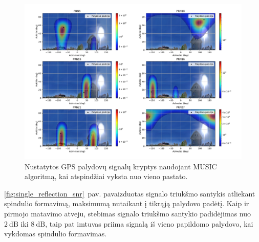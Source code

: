 \documentclass[main.tex]{subfiles}
\begin{document}
\begin{figure}[ht]
    \begin{centering}
    \includegraphics[scale=0.45]{drawings/one_reflection_2}
    \par\end{centering}
    \protect\caption{\label{fig:single_reflection}Nustatytos GPS palydovų signalų kryptys naudojant MUSIC algoritmą, kai atspindžiai vyksta nuo vieno pastato.}
\end{figure}

\ref{fig:single_reflection_snr}~pav. pavaizduotas signalo triukšmo santykis atliekant spindulio formavimą,
maksimumą nutaikant į tikrąją palydovo padėtį. Kaip ir pirmojo matavimo atveju, stebimas signalo triukšmo
santykio padidėjimas
nuo $2\ \mathrm{dB}$ iki $8\ \mathrm{dB}$, taip pat
imtuvas priima signalą iš vieno papildomo palydovo, kai vykdomas spindulio formavimas.
\end{document}
